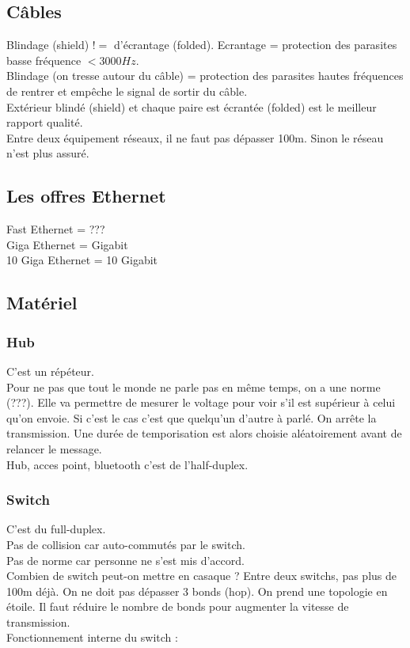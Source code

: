 \subsection{Câbles}
Blindage (shield) $!=$ d'écrantage (folded).
Ecrantage = protection des parasites basse fréquence $< 3000Hz$.\\
Blindage (on tresse autour du câble) = protection des parasites hautes fréquences de rentrer et empêche le signal de sortir du câble.\\
Extérieur blindé (shield) et chaque paire est écrantée (folded) est le meilleur rapport qualité.\\
Entre deux équipement réseaux, il ne faut pas dépasser 100m. Sinon le réseau n'est plus assuré.
\subsection{Les offres Ethernet}
Fast Ethernet = ???\\
Giga Ethernet = Gigabit\\
10 Giga Ethernet = 10 Gigabit
\subsection{Matériel}
\subsubsection{Hub}
C'est un répéteur.\\
Pour ne pas que tout le monde ne parle pas en même temps, on a une norme (???). Elle va permettre de mesurer le voltage pour voir s'il est supérieur à celui qu'on envoie. Si c'est le cas c'est que quelqu'un d'autre à parlé. On arrête la transmission. Une durée de temporisation est alors choisie aléatoirement avant de relancer le message.\\
Hub, acces point, bluetooth c'est de l'half-duplex.
\subsubsection{Switch}
C'est du full-duplex.\\
Pas de collision car auto-commutés par le switch.\\
Pas de norme car personne ne s'est mis d'accord.\\
Combien de switch peut-on mettre en casaque ? Entre deux switchs, pas plus de 100m déjà. On ne doit pas dépasser 3 bonds (hop). On prend une topologie en étoile. Il faut réduire le nombre de bonds pour augmenter la vitesse de transmission.\\
Fonctionnement interne du switch :
